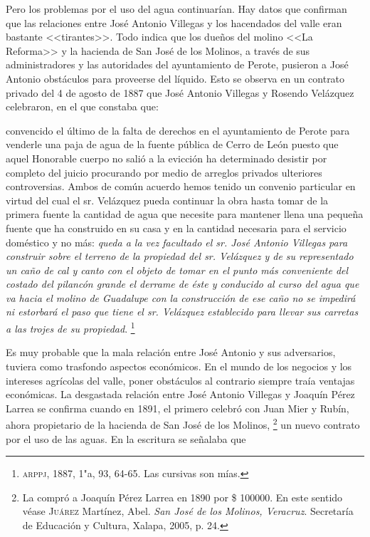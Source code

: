 \documentclass[14pt,twoside,final]{extbook} %
\let\oldfootnote\footnote
\renewcommand\footnote[1]{%
\oldfootnote{\hspace{1mm}#1}}
\begin{document}
Pero los problemas por el uso del agua continuarían. Hay datos que confirman que las relaciones entre José Antonio Villegas y los hacendados del valle eran bastante <<tirantes>>. Todo indica que los dueños del molino <<La Reforma>> y la hacienda de San José de los Molinos, a través de sus administradores y las autoridades del ayuntamiento de Perote, pusieron a José Antonio obstáculos para proveerse del líquido. Esto se observa en un contrato privado del 4 de agosto de 1887 que José Antonio Villegas y Rosendo Velázquez celebraron, en el que constaba que:
\begin{quoting}
convencido el último de la falta de derechos en el ayuntamiento de Perote para venderle una paja de agua de la fuente pública de Cerro de León puesto que aquel Honorable cuerpo no salió a la evicción ha determinado desistir por completo del juicio procurando por medio de arreglos privados ulteriores controversias. Ambos de común acuerdo hemos tenido un convenio particular en virtud del cual el sr. Velázquez pueda continuar la obra hasta tomar de la primera fuente la cantidad de agua que necesite para mantener llena una pequeña fuente que ha construido en su casa y en la cantidad necesaria para el servicio doméstico y no más: \emph{queda a la vez facultado el sr. José Antonio Villegas para construir sobre el terreno de la propiedad del sr. Velázquez y de su representado un caño de cal y canto con el objeto de tomar en el punto más conveniente del costado del pilancón grande el derrame de éste y conducido al curso del agua que va hacia el molino de Guadalupe con la construcción de ese caño no se impedirá ni estorbará el paso que tiene el sr. Velázquez establecido para llevar sus carretas a las trojes de su propiedad}.\footnote{\textsc{arppj}, 1887, 1"a, 93, 64-65. Las cursivas son mías.}
\end{quoting}
Es muy probable que la mala relación entre José Antonio y sus adversarios, tuviera como trasfondo aspectos económicos. En el mundo de los negocios y los intereses agrícolas del valle, poner obstáculos al contrario siempre traía ventajas económicas. La desgastada relación entre José Antonio Villegas y Joaquín Pérez Larrea se confirma cuando en 1891, el primero celebró con Juan Mier y Rubín, ahora propietario de la hacienda de San José de los Molinos,\footnote{La compró a Joaquín Pérez Larrea en 1890 por \$ 100000. En este sentido véase \textsc{Juárez} Martínez, Abel. \emph{San José de los Molinos, Veracruz}. Secretaría de Educación y Cultura, Xalapa, 2005, p. 24.} un nuevo contrato por el uso de las aguas. En la escritura se señalaba que
\end{document}
